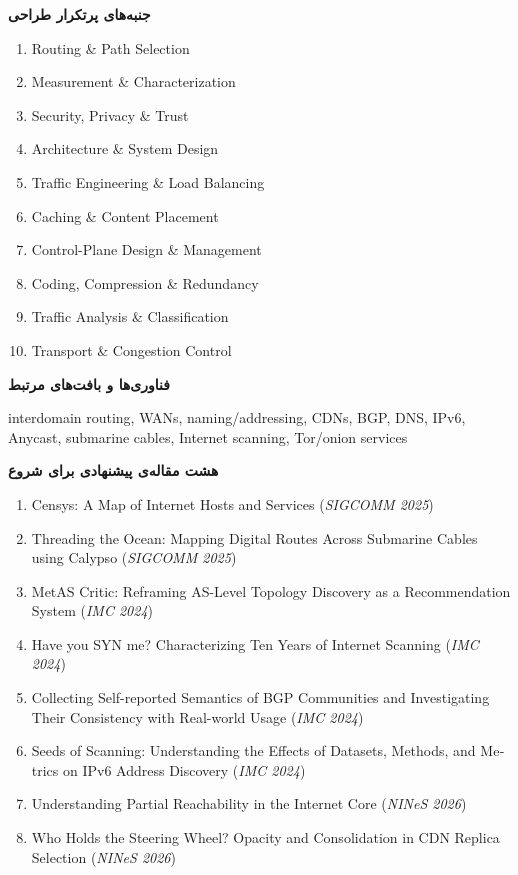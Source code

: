 \documentclass[12pt]{article}
\newcommand{\projectarea}[4]{%
\clearpage
\begin{tcolorbox}[
    colback=black!2,
    colframe=black!40,
    boxrule=0.5pt,
    arc=1mm,
    left=3mm,right=3mm,top=2mm,bottom=2mm,
    before skip=8pt,after skip=8pt
]
\linespread{1.08}\selectfont
\begin{latin}
\noindent{\large\bfseries #1}\par
\end{latin}
\smallskip
\textbf{جنبه‌های پرتکرار طراحی}\par
\vspace{1mm}
\begin{latin}
\small\raggedright
\begin{enumerate}[leftmargin=*,nosep,label=\arabic*.]
#2
\end{enumerate}
\end{latin}
\smallskip
\textbf{فناوری‌ها و بافت‌های مرتبط}\par
\begin{latin}
\small\raggedright #3\par
\end{latin}
\smallskip
\textbf{هشت مقاله‌ی پیشنهادی برای شروع}\par
\begin{latin}
\small\raggedright
\begin{enumerate}[leftmargin=*,nosep,label=\arabic*.]
#4
\end{enumerate}
\end{latin}
\end{tcolorbox}
}
\begin{document}
\projectarea{Internet Routing, WAN \& CDN}{
    \item Routing \& Path Selection
    \item Measurement \& Characterization
    \item Security, Privacy \& Trust
    \item Architecture \& System Design
    \item Traffic Engineering \& Load Balancing
    \item Caching \& Content Placement
    \item Control-Plane Design \& Management
    \item Coding, Compression \& Redundancy
    \item Traffic Analysis \& Classification
    \item Transport \& Congestion Control
}{interdomain routing, WANs, naming/addressing, CDNs, BGP, DNS, IPv6, Anycast, submarine cables, Internet scanning, Tor/onion services}{
\item Censys: A Map of Internet Hosts and Services (\textit{SIGCOMM 2025})
\item Threading the Ocean: Mapping Digital Routes Across Submarine Cables using Calypso (\textit{SIGCOMM 2025})
\item MetAS Critic: Reframing AS-Level Topology Discovery as a Recommendation System (\textit{IMC 2024})
\item Have you SYN me? Characterizing Ten Years of Internet Scanning (\textit{IMC 2024})
\item Collecting Self-reported Semantics of BGP Communities and Investigating Their Consistency with Real-world Usage (\textit{IMC 2024})
\item Seeds of Scanning: Understanding the Effects of Datasets, Methods, and Metrics on IPv6 Address Discovery (\textit{IMC 2024})
\item Understanding Partial Reachability in the Internet Core (\textit{NINeS 2026})
\item Who Holds the Steering Wheel? Opacity and Consolidation in CDN Replica Selection (\textit{NINeS 2026})
}
\end{document}
